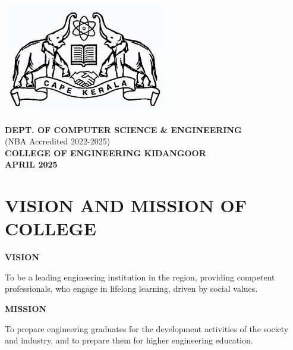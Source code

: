\documentclass[twoside,a4paper,openright]{report} %
\begin{document}
	\begin{center}
		
		\vspace{0.8cm}   %
		
		\includegraphics[scale=0.2]{cape.jpeg}
		
		\textbf{DEPT. OF COMPUTER SCIENCE \& ENGINEERING}\\
		(NBA Accredited 2022-2025)\\
		\vspace{0.3cm}   %
		\textbf{COLLEGE OF ENGINEERING KIDANGOOR}\\
		\vspace{0.3cm}   %
		\textbf{APRIL 2025}\\
	\end{center}
	
	
	
	
	
	
	\newpage
	\vspace*{6cm}
\section*{\centering \large VISION AND MISSION OF COLLEGE} %
	\begin{center}
	\vspace{1 cm}
	\textbf{VISION}\\
	\end{center}
	To be a leading engineering institution in the region, providing competent professionals, who engage in lifelong learning, driven by social values.
	\begin{center} 
	\vspace{1 cm}
	\textbf{MISSION} \\
	\end{center}
	To prepare engineering graduates for the development activities of the society and industry, and to prepare them for higher engineering education.
	
\end{document}
